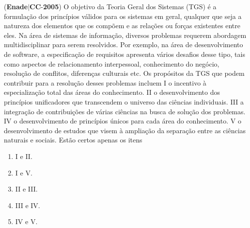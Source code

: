 \documentclass{exam}
\begin{document}
\begin{questions}
\question (\textbf{Enade}$|$\textbf{CC}-\textbf{2005}) O objetivo da Teoria Geral dos Sistemas (TGS) é a formulação
dos princípios válidos para os sistemas em geral, qualquer que
seja a natureza dos elementos que os compõem e as relações ou
forças existentes entre eles. Na área de sistemas de informação,
diversos problemas requerem abordagem multidisciplinar para
serem resolvidos. Por exemplo, na área de desenvolvimento de
software, a especificação de requisitos apresenta vários desafios
desse tipo, tais como aspectos de relacionamento interpessoal,
conhecimento do negócio, resolução de conflitos, diferenças
culturais etc. Os propósitos da TGS que podem contribuir para
a resolução desses problemas incluem
I o incentivo à especialização total das áreas do
conhecimento.
II o desenvolvimento dos princípios unificadores que
transcendem o universo das ciências individuais.
III a integração de contribuições de várias ciências na busca de
solução dos problemas.
IV o desenvolvimento de princípios únicos para cada área do
conhecimento.
V o desenvolvimento de estudos que visem à ampliação da
separação entre as ciências naturais e sociais.
Estão certos apenas os itens
	\begin{enumerate}[label=\alph*)]
		\item  I e II.
		\item  I e V.
		\item  II e III.
		\item  III e IV.
		\item  IV e V.

	\end{enumerate}


\end{questions}
\end{document}
